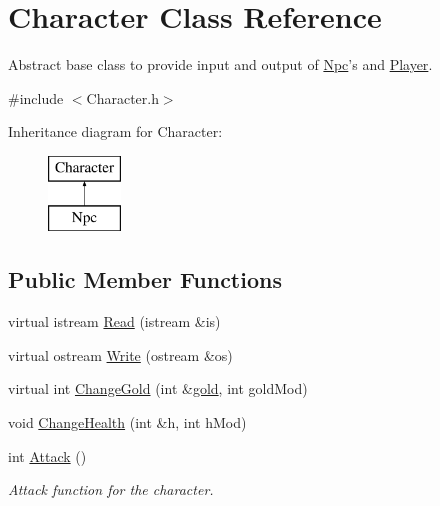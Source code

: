 \hypertarget{classCharacter}{\section{Character Class Reference}
\label{classCharacter}
}


Abstract base class to provide input and output of \hyperlink{classNpc}{Npc}'s and \hyperlink{classPlayer}{Player}.  




{\ttfamily \#include $<$Character.\-h$>$}

Inheritance diagram for Character\-:\begin{figure}[H]
\begin{center}
\leavevmode
\includegraphics[height=2.000000cm]{classCharacter}
\end{center}
\end{figure}
\subsection*{Public Member Functions}
\begin{DoxyCompactItemize}
\item 
virtual istream \hyperlink{classCharacter_a21de96f408a3db5e0734012c27587c8c}{Read} (istream \&is)
\item 
virtual ostream \hyperlink{classCharacter_ab1af9d183d124e11e46d4b2868f846dc}{Write} (ostream \&os)
\item 
virtual int \hyperlink{classCharacter_a250678a82a39b73cc3c622b9e88a7877}{Change\-Gold} (int \&\hyperlink{classCharacter_ab8dd866071dba429a35555e0c372e162}{gold}, int gold\-Mod)
\item 
void \hyperlink{classCharacter_a39bd3a1eca5362f69aea167bda1b336e}{Change\-Health} (int \&h, int h\-Mod)
\item 
int \hyperlink{classCharacter_afaa737ad669c882598bb65f5f6c57376}{Attack} ()
\begin{DoxyCompactList}\small\item\em Attack function for the character. \end{DoxyCompactList}\end{DoxyCompactItemize}

